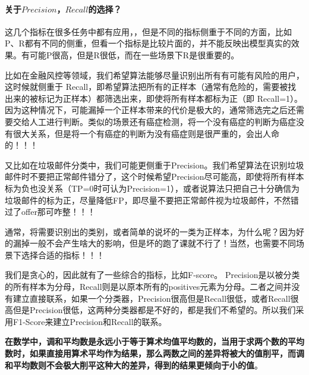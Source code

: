\paragraph*{关于$Precision$，$Recall$的选择？}这几个指标在很多任务中都有应用，，但是不同的指标侧重于不同的方面，比如P、R都有不同的侧重，但看一个指标是比较片面的，并不能反映出模型真实的效果。有可能P很高，但是R很低，而在一些场景下R是很重要的。

比如在金融风控等领域，我们希望算法能够尽量识别出所有有可能有风险的用户，这时候就侧重于 Recall，即希望算法把所有的正样本（通常有危险的，需要被找出来的被标记为正样本）都筛选出来，即使将所有样本都标为正（即 Recall=1）。因为这种情况下，可能漏掉一个正样本带来的代价是极大的，通常筛选完之后还需要交给人工进行判断。类似的场景还有癌症检测，将一个没有癌症的判断为癌症没有很大关系，但是将一个有癌症的判断为没有癌症则是很严重的，会出人命的！！！

又比如在垃圾邮件分类中，我们可能更侧重于Precision。我们希望算法在识别垃圾邮件时不要把正常邮件错分了，这个时候希望Precision尽可能高，即使将所有样本标为负也没关系（TP=0时可认为Precision=1），或者说算法只把自己十分确信为垃圾邮件的标为正，尽量降低FP，即尽量不要把正常邮件视为垃圾邮件，不然错过了offer那可咋整！！！

通常，将需要识别出的类别，或者简单的说坏的一类为正样本，为什么呢？因为好的漏掉一般不会产生啥大的影响，但是坏的跑了课就不行了！当然，也需要不同场景下选择合适的指标！！！

我们是贪心的，因此就有了一些综合的指标，比如F-score。
Precision是以被分类的所有样本为分母，Recall则是以原本所有的positives元素为分母。二者之间并没有建立直接联系，如果一个分类器，Precision很高但是Recall很低，或者Recall很高但是Precision很低，这两种分类器都是不好的，都是我们不希望的。所以我们采用F1-Score来建立Precision和Recall的联系。

\textbf{在数学中，调和平均数是永远小于等于算术均值平均数的，当用于求两个数的平均数时，如果直接用算术平均作为结果，那么两数之间的差异将被大的值削平，而调和平均数则不会极大削平这种大的差异，得到的结果更倾向于小的值}。

